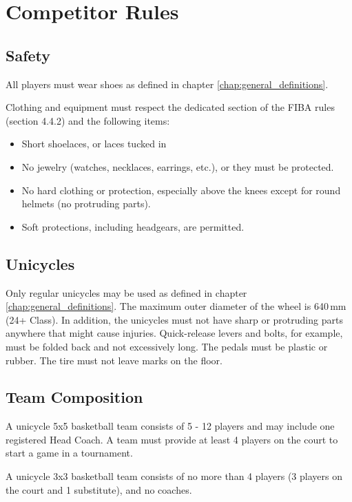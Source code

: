 \chapter{Competitor Rules}

\section{Safety}

All players must wear shoes as defined in chapter \ref{chap:general_definitions}.

Clothing and equipment must respect the dedicated section of the FIBA rules (section 4.4.2) and the following items:
\begin{itemize}
\item Short shoelaces, or laces tucked in
\item No jewelry (watches, necklaces, earrings, etc.), or they must be protected.
\item No hard clothing or protection, especially above the knees except for round helmets (no protruding parts).
\item Soft protections, including headgears, are permitted.
\end{itemize}

\section{Unicycles}

Only regular unicycles may be used as defined in chapter \ref{chap:general_definitions}.
The maximum outer diameter of the wheel is 640\,mm (24+ Class).
In addition, the unicycles must not have sharp or protruding parts anywhere that might cause injuries.
Quick-release levers and bolts, for example, must be folded back and not excessively long.
The pedals must be plastic or rubber.
The tire must not leave marks on the floor.

\section{Team Composition}

A unicycle 5x5 basketball team consists of 5 - 12 players and may include one
registered Head Coach. A team must provide at least 4 players on the court
to start a game in a tournament.

A unicycle 3x3 basketball team consists of no more than 4 players (3
players on the court and 1 substitute), and no coaches.

